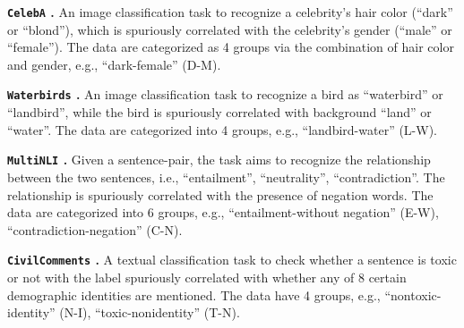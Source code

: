 \documentclass{article} %
\begin{document}
	\textbf{\texttt{CelebA} \citep{liu2015deep}.} An image classification task to recognize a celebrity's hair color (``dark'' or ``blond''), which is spuriously correlated with the celebrity's gender (``male'' or ``female''). The data are categorized as 4 groups via the combination of hair color and gender, e.g., ``dark-female'' (D-M). 
	\par
	\textbf{\texttt{Waterbirds} \citep{sagawa2019distributionally}.} An image classification task to recognize a bird as ``waterbird'' or ``landbird'', while the bird is spuriously correlated with background ``land'' or ``water''. The data are categorized into 4 groups, e.g., ``landbird-water'' (L-W). 
	\par
	\textbf{\texttt{MultiNLI} \citep{williams2018broad}.} Given a sentence-pair, the task aims to recognize the relationship between the two sentences, i.e., ``entailment'', ``neutrality'', ``contradiction''. The relationship is spuriously correlated with the presence of negation words. The data are categorized into 6 groups, e.g., ``entailment-without negation'' (E-W), ``contradiction-negation'' (C-N). 
	\par
	\textbf{\texttt{CivilComments} \citep{borkan2019nuanced}.} A textual classification task to check whether a sentence is toxic or not with the label spuriously correlated with whether any of 8 certain demographic identities are mentioned. The data have 4 groups, e.g., ``nontoxic-identity'' (N-I), ``toxic-nonidentity'' (T-N). 
\end{document}
